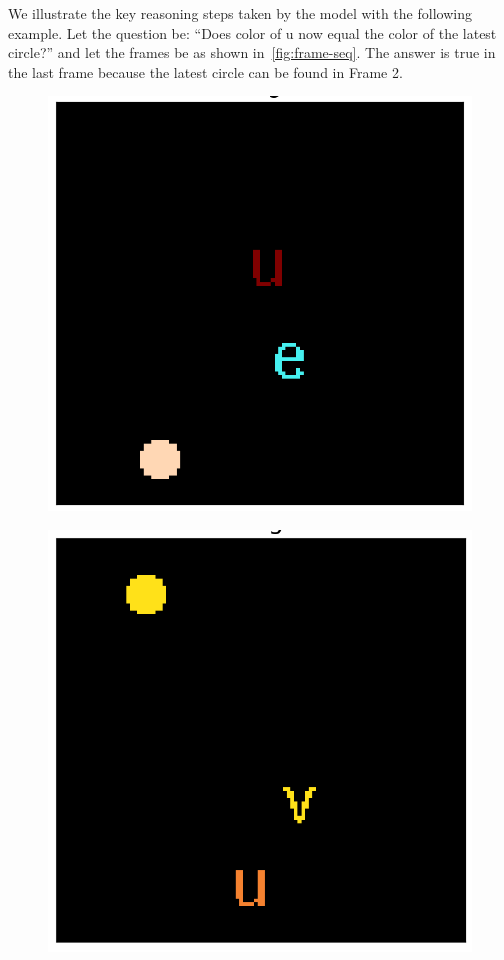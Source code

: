 We illustrate the key reasoning steps taken by the model with the following example.
Let the question be: ``Does color of u now equal the color of the latest circle?''
and let the frames be as shown in~\cref{fig:frame-seq}.
The answer is true in the last frame because the latest circle can be found in Frame 2. 
\begin{figure}[!h]
\begin{minipage}{0.25\textwidth}
\centering
\includegraphics[width=0.9\linewidth]{"../img/visualization/experiment_run_20190917_022319/Frame 1"}
\label{fig:frame-1}
\end{minipage}\hfill
\begin{minipage}{0.25\textwidth}
	\centering
	\includegraphics[width=0.9\linewidth]{"../img/visualization/experiment_run_20190917_022319/Frame 2"}

\end{minipage}
\end{figure}
